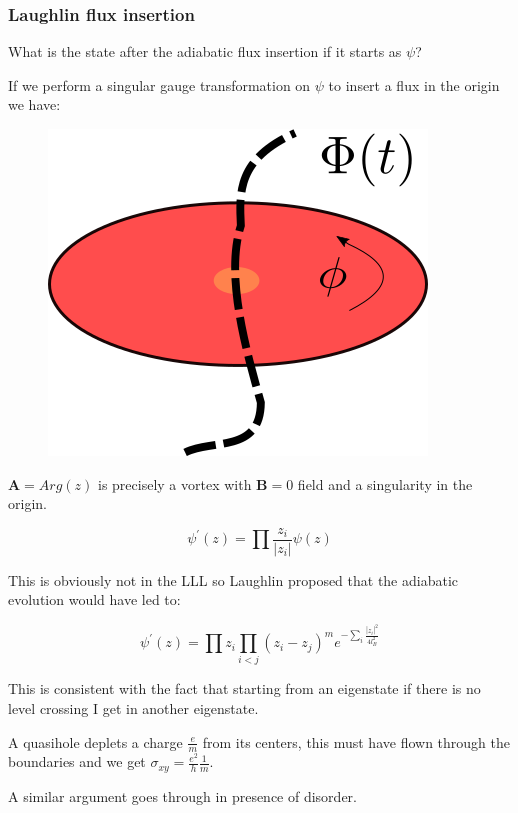 \documentclass{beamer}
\begin{document}
\begin{frame}
\frametitle{Laughlin flux insertion}
\begin{center}


What is the state after the adiabatic flux insertion if it starts as $\psi$?

If we perform a singular gauge transformation on $\psi$ to insert a flux in the origin we have:

\begin{figure}[!htb]
\centering
\includegraphics[scale=0.3]{fluxInsertion.png}
\end{figure}

$\mathbf{A} = Arg \left( z \right)$ is precisely a vortex with $\mathbf{B} = 0$ field and a singularity in the origin.

\[
\psi^{'}(z) = \prod \frac{z_i}{|z_i|} \psi(z)
\]

\end{center}
\end{frame}

\begin{frame}
\begin{center}

This is obviously not in the LLL so Laughlin proposed that the adiabatic evolution would have led to:

\[
\psi^{'}(z) = \prod z_i \prod_{i<j} (z_i - z_j)^m e^{- \sum_{i} \frac{|z_i|^2}{4 l_B^2}}
\]

This is consistent with the fact that starting from an eigenstate if there is no level crossing I get in another eigenstate.


A quasihole deplets a charge $\frac{e}{m}$ from its centers, this must have flown through the boundaries and we get $\sigma_{xy} = \frac{e^2}{h} \frac{1}{m}$.

\vspace{10pt}
A similar argument goes through in presence of disorder.

\end{center}
\end{frame}
\end{document}
